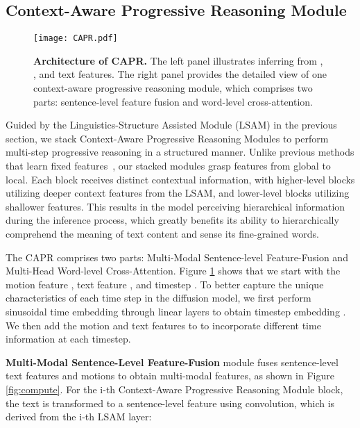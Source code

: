 \documentclass[10pt,twocolumn,letterpaper]{article}
\begin{document}
\subsection{Context-Aware Progressive Reasoning Module}
\label{sec:CAPR}
\begin{figure}[t]
  \centering
  \texttt{[image: CAPR.pdf]}
  \caption{\textbf{Architecture of CAPR.} The left panel illustrates inferring  from , , and text features. The right panel provides the detailed view of one context-aware progressive reasoning module, which comprises two parts: sentence-level feature fusion and word-level cross-attention.}
  \label{fig:CAPR}
\end{figure}



Guided by the Linguistics-Structure Assisted Module (LSAM) in the previous section, we stack Context-Aware Progressive Reasoning Modules to perform multi-step progressive reasoning in a structured manner. Unlike previous methods that learn fixed features~\cite{tevet2022human,zhang2022motiondiffuse}, our stacked modules grasp features from global to local. Each block receives distinct contextual information, with higher-level blocks utilizing deeper context features from the LSAM, and lower-level blocks utilizing shallower features. This results in the model perceiving hierarchical information during the inference process, which greatly benefits its ability to hierarchically comprehend the meaning of text content and sense its fine-grained words. 


The CAPR comprises two parts: Multi-Modal Sentence-level Feature-Fusion and Multi-Head Word-level Cross-Attention. Figure \ref{fig:CAPR} shows that we start with the motion feature , text feature , and timestep . 
To better capture the unique characteristics of each time step in the diffusion model, we first perform sinusoidal time embedding through linear layers to obtain timestep embedding . We then add the motion and text features to  to incorporate different time information at each timestep.







\textbf{Multi-Modal Sentence-Level Feature-Fusion} module fuses sentence-level text features and motions to obtain multi-modal features, as shown in Figure \ref{fig:compute}. For the i-th Context-Aware Progressive Reasoning Module block, the text  is transformed to a sentence-level feature  using convolution, which is derived from the i-th LSAM layer:
\end{document}
